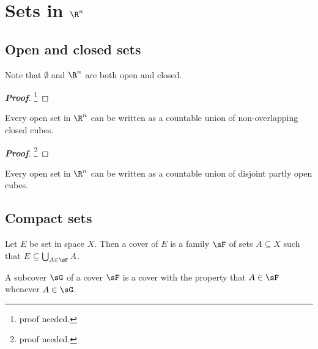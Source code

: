 \section{Sets in $\R^n$}%





\subsection{Open and closed sets}

\begin{proposition}
Note that $\emptyset$ and $\R^n$ are both open and closed.
\end{proposition}

\begin{proof}[\bf Proof]
\footnote{proof needed.}
\end{proof}

\begin{theorem}\label{thm:open_set_multi_dimensional_real_n_can_be_countable_union_of_almost_disjoint_closed_cubes}%
Every open set in $\R^n$ can be written as a countable union of non-overlapping closed cubes.
\end{theorem}

\begin{proof}[\bf Proof]
\footnote{proof needed.}
\end{proof}

\begin{theorem}
Every open set in $\R^n$ can be written as a countable union of disjoint partly open cubes.
\end{theorem}



\subsection{Compact sets}

\begin{definition}
Let $E$ be set in space $X$. Then a cover of $E$ is a family $\sF$ of sets $A\subseteq X$ such that $E\subseteq\bigcup_{A\in \sF} A$.
\end{definition}

\begin{definition}
A subcover $\sG$ of a cover $\sF$ is a cover with the property that $A \in \sF$ whenever $A \in \sG$.
\end{definition}

